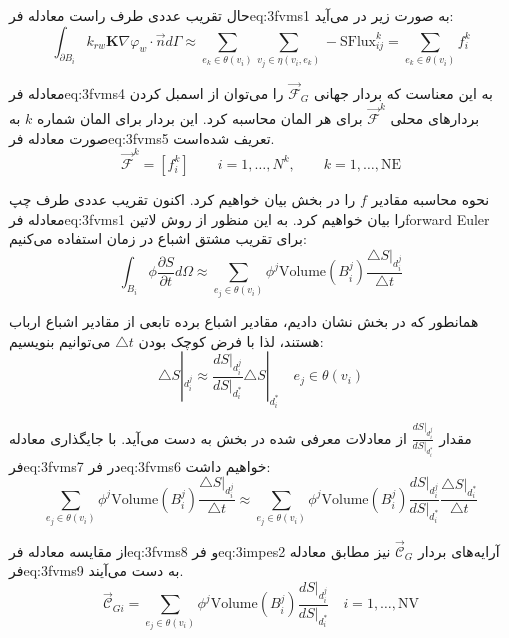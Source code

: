 حال تقریب عددی طرف راست معادله ‌فر{eq:3fvms1} به صورت زیر در می‌آید:
\begin{equation}
\label{eq:3fvms4}
\int_{\partial B_i} 
k_{rw} \textbf{K} \nabla \varphi_w \cdot \vec{n} d\Gamma 
\approx \sum_{e_k\in\theta(v_i)} \sum_{v_j\in\eta(v_i,e_k)} -\text{SFlux}_{ij}^k  
=	\sum_{e_k \in \theta(v_i)} f_i^k
\end{equation}

معادله ‌فر{eq:3fvms4} به این معناست که بردار جهانی $\vec{\mathcal F}_G$ را می‌توان از اسمبل کردن بردار‌های محلی $\vec{\mathcal F}^k$ برای هر المان محاسبه کرد. این بردار برای المان شماره $k$ به صورت معادله ‌فر{eq:3fvms5} تعریف شده‌است. 
\begin{equation}
\label{eq:3fvms5}
\vec{\mathcal F}^k = \left[ f_i^k \right] \qquad i= 1,\ldots,N^k,  \qquad  k=1,\ldots,\text{NE}
\end{equation}

نحوه محاسبه مقادیر $f$ را در بخش   بیان خواهیم کرد. اکنون تقریب عددی طرف چپ معادله ‌فر{eq:3fvms1} را بیان خواهیم کرد. به این منظور از روش ‌لاتین{forward Euler} برای تقریب مشتق اشباع در زمان استفاده می‌کنیم:
\begin{equation}
\label{eq:3fvms6}
\int_{B_i}  \phi \frac{\partial S}{\partial t} d\Omega \approx
\sum_{e_j \in \theta(v_i)} \phi^j \text{Volume}(B_i^j)  \frac{\triangle S|_{d_i^j}}{\triangle t} 
\end{equation}

همانطور که در بخش   نشان دادیم، مقادیر اشباع برده تابعی از مقادیر اشباع ارباب هستند، لذا با فرض کوچک بودن $\triangle t$ می‌توانیم بنویسیم:
\begin{equation}
\label{eq:3fvms7}
\triangle S|_{d_i^j} \approx 
\frac{d S|_{d_i^j}}{d S|_{d_i^*}}\triangle S|_{d_i^*} \quad
e_j \in \theta( v_i )
\end{equation}

مقدار $\frac{d S|_{d_i^j}}{d S|_{d_i^*}}$ از معادلات معرفی شده در بخش   به دست می‌آید. با جایگذاری معادله ‌فر{eq:3fvms7} در ‌فر{eq:3fvms6} خواهیم داشت:
\begin{equation}
\label{eq:3fvms8}
\sum_{e_j \in \theta(v_i)} \phi^j \text{Volume}(B_i^j)  \frac{\triangle S|_{d_i^j}}{\triangle t} \approx
\sum_{e_j \in \theta(v_i)} \phi^j \text{Volume}(B_i^j)  \frac{d S|_{d_i^j}}{d S|_{d_i^*}} \frac{\triangle S|_{d_i^*}}{\triangle t}
\end{equation}

از مقایسه معادله ‌فر{eq:3fvms8} و ‌فر{eq:3impes2} آرایه‌های بردار 
$\vec {\mathcal{C}}_G$
نیز مطابق معادله ‌فر{eq:3fvms9} به دست می‌آیند.
\begin{equation}
\label{eq:3fvms9}
\vec {\mathcal{C}}_{Gi} = 
\sum_{e_j \in \theta(v_i)} \phi^j \text{Volume}(B_i^j)
\frac{d S|_{d_i^j}}{d S|_{d_i^*}} 
\quad i=1,\ldots,\text{NV}
\end{equation}

